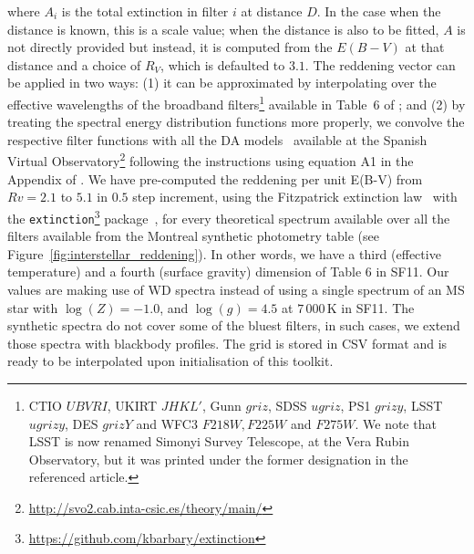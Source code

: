 \documentclass[fleqn,usenatbib]{rasti}
\begin{document}
where $A_i$ is the total extinction in filter $i$ at distance $D$. In the case
when the distance is known, this is a scale value; when the distance is also
to be fitted, $A$ is not directly provided but instead, it is computed from the
$E(B-V)$ at that distance and a choice of $R_{V}$, which is defaulted to $3.1$.
The reddening vector can be applied in two ways: (1) it can be approximated by
interpolating over the effective wavelengths of the broadband
filters\footnote{CTIO $UBVRI$, UKIRT $JHKL'$, Gunn $griz$, SDSS $ugriz$,
PS1 $grizy$, LSST $ugrizy$, DES $grizY$ and WFC3 $F218W, F225W$ and $F275W$.
We note that LSST is now renamed Simonyi Survey Telescope, at the Vera Rubin
Observatory, but it was printed under the former designation in the referenced
article.} available in Table~6 of \citet{2011ApJ...737..103S}; and (2) by
treating the spectral energy distribution functions more properly, we convolve
the respective filter functions with all the DA
models~\citep{2009ApJ...696.1755T, 2010MmSAI..81..921K} available at the
Spanish Virtual
Observatory\footnote{\url{http://svo2.cab.inta-csic.es/theory/main/}} following
the instructions using equation A1 in the Appendix of \citet[][SF11]{2011ApJ...737..103S}. We have pre-computed the
reddening per unit E(B-V) from $Rv = 2.1$ to $5.1$ in $0.5$ step increment, using the
Fitzpatrick extinction law~\citep{1999PASP..111...63F} with the
\texttt{extinction}\footnote{\url{https://github.com/kbarbary/extinction}}
package~\citep{2016zndo....804967B}, for every theoretical
spectrum available over all the filters available from the Montreal synthetic
photometry table (see Figure~\ref{fig:interstellar_reddening}).
In other words, we have a third (effective temperature) and a fourth (surface gravity) dimension
of Table 6 in SF11. Our values are making use of WD spectra instead of using a single spectrum of an MS star with $\log(Z) = -1.0$, and $\log(g) = 4.5$ at $7\,000$\,K in SF11.
The synthetic
spectra do not cover some of the bluest filters, in such cases, we extend
those spectra with blackbody profiles. The grid is stored in CSV format and
is ready to be interpolated upon initialisation of this toolkit.
\end{document}
